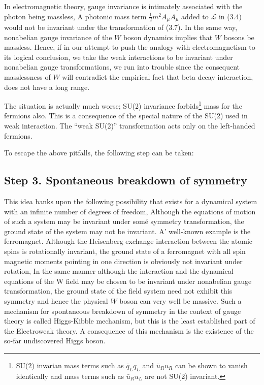 In electromagnetic theory, gauge invariance is intimately associated with the photon being
massless, A photonic mass term $\frac{1}{2}m^{2}A_{\mu}A_{\mu}$ added to $\mathcal{L}$ in (3.4) would not be invariant under
the transformation of (3.7). In the same way, nonabelian gauge invariance of the $W$ boson dynamics
implies that $W$ bosons be massless. Hence, if in our attempt to push the analogy with electromagnetism
to its logical conclusion, we take the weak interactions to be invariant under nonabelian gauge
transformations, we run into trouble since the consequent masslessness of $W$ will contradict the
empirical fact that beta decay interaction, does not have a long range. 

The situation is actually much worse; SU(2) invariance forbids\footnote{SU(2) invarian mass terms such as $\bar{q}_{L} q_{L}$ and $\bar{u}_{R}u_{R}$ can be shown to vanish identically and mass terms such as $\bar{u}_{R}u_{L}$ are not SU(2) invariant.}
mass for the fermions also. This is a consequence of the special nature of the SU(2) used in weak interaction. The “weak SU(2)”
transformation acts only on the left-handed fermions. 

To escape the above pitfalls, the following step can be taken: 

\subsection{Step 3. Spontaneous breakdown of symmetry}

This idea banks upon the following possibility that exists for a dynamical system with an infinite
number of degrees of freedom, Although the equations of motion of such a system may be invariant
under somé symmetry transformation, the ground state of the system may not be invariant. A’
well-known example is the ferromagnet. Although the Heisenberg exchange interaction between the
atomic spins is rotationally invariant, the ground state of a ferromagnet with all spin magnetic
moments pointing in one direction is obviously not invariant under rotation, In the same manner
although the interaction and the dynamical equations of the W field may be chosen to be invariant
under nonabelian gauge transformation, the ground state of the field system need not exhibit this
symmetry and hence the physical $W$ boson can very well be massive. Such a mechanism for
spontaneous breakdown of symmetry in the context of gauge theory is called Higgs-Kibble mechanism,
but this is the least established part of the Electroweak theory. A consequence of this mechanism
is the existence of the so-far undiscovered Higgs boson. 


